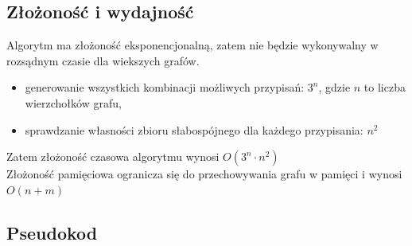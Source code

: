 \subsection{Złożoność i wydajność}

Algorytm ma złożoność eksponencjonalną, zatem nie będzie wykonywalny w rozsądnym czasie dla wiekszych grafów.
\begin{itemize}
    \item generowanie wszystkich kombinacji możliwych przypisań: $3^n$, gdzie $n$ to liczba wierzchołków grafu,
    \item sprawdzanie własności zbioru słabospójnego dla każdego przypisania: $n^2$
\end{itemize}

Zatem złożoność czasowa algorytmu wynosi $O(3^n \cdot n^2)$\\
Złożoność pamięciowa ogranicza się do przechowywania grafu w pamięci i wynosi $O(n + m)$

\subsection{Pseudokod}

